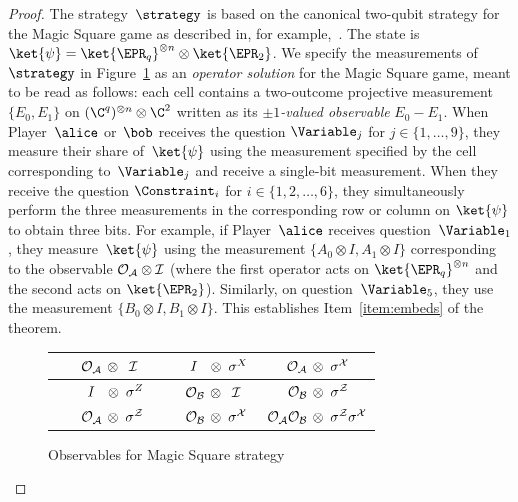 \begin{proof}
  The strategy~$\strategy$ is based on the canonical two-qubit strategy for the
  Magic Square game as described in, for example,~\cite{aravind2002simple}.
  The state is $\ket{\psi} = \ket{\EPR_q}^{\otimes n} \otimes \ket{\EPR_2}$.
  We specify the measurements of~$\strategy$ in
  Figure~\ref{fig:ms-operator-soln} as an \emph{operator solution} for the Magic
  Square game, meant to be read as follows: each cell contains a two-outcome
  projective measurement $\{E_0, E_1\}$ on $(\C^q)^{\otimes n} \otimes \C^2$
  written as its \emph{$\pm 1$-valued observable} $E_0 - E_1$.
  When Player~$\alice$ or~$\bob$ receives the question $\Variable_j$ for $j \in
  \{1, \ldots, 9\}$, they measure their share of~$\ket{\psi}$ using the
  measurement specified by the cell corresponding to~$\Variable_j$ and receive a
  single-bit measurement.
  When they receive the question $\Constraint_i$ for $i \in \{1,2,\ldots,6\}$,
  they simultaneously perform the three measurements in the corresponding row or
  column on $\ket{\psi}$ to obtain three bits.
  For example, if Player~$\alice$ receives question~$\Variable_1$, they
  measure~$\ket{\psi}$ using the measurement $\{A_0 \otimes I, A_1 \otimes I\}$
  corresponding to the observable $\cal{O}_A \otimes I$ (where the first
  operator acts on $\ket{\EPR_q}^{\otimes n}$ and the second acts on
  $\ket{\EPR_2}$).
  Similarly, on question~$\Variable_5$, they use the measurement $\{B_0 \otimes
  I, B_1 \otimes I\}$.
  This establishes Item~\ref{item:embeds} of the theorem.
  \begin{figure}[ht!]
    \begin{center}
      \renewcommand{\arraystretch}{2.4}
      \begin{tabularx}{.6\textwidth}{| X | X | X |}
        \hline
        $ \phantom{I\;\;O}\cal{O}_A\, \otimes \; \;I$
        & $ \phantom{\cal{O}_BO} I\;\;\, \otimes \; \sigma^X$
        & $ \phantom{\cal{O}_B\;}\cal{O}_A\, \otimes \; \sigma^X$ \\
        \hline
        $ \phantom{\cal{O}_AO} I\;\;\, \otimes \; \sigma^Z$
        & $ \phantom{I\;\;O}\cal{O}_B\, \otimes \; \;I$
        & $ \phantom{\cal{O}_A\;}\cal{O}_B\, \otimes \; \sigma^Z$ \\
        \hline
        $ \phantom{I\;\;O}\cal{O}_A \, \otimes \; \sigma^Z$
        & $ \phantom{I\;\;O}\cal{O}_B \, \otimes \; \sigma^X$
        & $ \; \cal{O}_A \cal{O}_B \, \otimes \; \sigma^Z \sigma^X$ \\
        \hline
      \end{tabularx}
      \caption{Observables for Magic Square strategy}
      \label{fig:ms-operator-soln}
		\end{center}
  \end{figure}
  

\end{proof}
